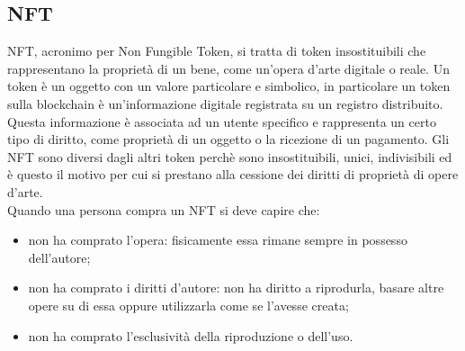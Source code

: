 \subsection{NFT}

\gls{NFT}, acronimo per Non Fungible Token, si tratta di token insostituibili che rappresentano la proprietà di un bene, come un'opera d'arte digitale o reale. Un token è un oggetto con un valore particolare e simbolico, in particolare un token sulla blockchain è un'informazione digitale registrata su un registro distribuito. Questa informazione è associata ad un utente specifico e rappresenta un certo tipo di diritto, come proprietà di un oggetto o la ricezione di un pagamento. Gli \gls{NFT} sono diversi dagli altri token perchè sono insostituibili, unici, indivisibili ed è questo il motivo per cui si prestano alla cessione dei diritti di proprietà di opere d'arte.\\
Quando una persona compra un \gls{NFT} si deve capire che:
\begin{itemize}
	\item non ha comprato l'opera: fisicamente essa rimane sempre in possesso dell'autore;
	\item non ha comprato i diritti d'autore: non ha diritto a riprodurla, basare altre opere su di essa oppure utilizzarla come se l'avesse creata;
	\item non ha comprato l'esclusività della riproduzione o dell'uso.
\end{itemize}

